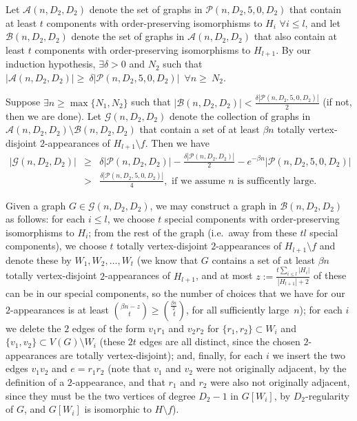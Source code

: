 \documentclass{article}
\newtheorem{Proof of Theorem}{Proof of Theorem}
\begin{document}
Let $\mathcal{A}(n,D_{2},D_{2})$ denote the set of graphs in $\mathcal{P}(n,D_{2},5,0,D_{2})$
that contain at least $t$ components with order-preserving isomorphisms to $H_{i}$ $\forall i \leq l$,
and let $\mathcal{B}(n,D_{2},D_{2})$ denote the set of graphs in $\mathcal{A}(n,D_{2},D_{2})$
that also contain at least $t$ components with order-preserving isomorphisms to $H_{l+1}$.
By our induction hypothesis,
$\exists \delta >0$ and $N_{2}$ such that
$|\mathcal{A}(n,D_{2},D_{2})| \!\geq~\!\!\delta |\mathcal{P}(n,D_{2},5,0,D_{2})|$~$\forall n \!\geq~\!\!N_{2}$.

Suppose $\exists n \geq \max \{ N_{1},N_{2} \}$ such that 
$|\mathcal{B}(n,D_{2},D_{2})| < \frac{\delta |\mathcal{P}(n,D_{2},5,0,D_{2})|}{2}$
(if not, then we are done).
Let $\mathcal{G}(n,D_{2},D_{2})$ denote the collection of graphs in 
$\mathcal{A}(n,D_{2},D_{2}) \setminus \mathcal{B}(n,D_{2},D_{2})$ that
contain a set of at least $\beta n$ totally vertex-disjoint $2$-appearances of $H_{l+1} \setminus f$.
Then we have 
\begin{eqnarray*}
|\mathcal{G}(n,D_{2},D_{2})| 
& \geq & \delta |\mathcal{P}(n,D_{2},D_{2})| \!-\! \frac{ \delta |\mathcal{P}(n,D_{2},D_{2})| }{2}
\!-\! e^{- \beta n} |\mathcal{P}(n,D_{2},5,0,D_{2})| \\
& > & \frac{\delta |\mathcal{P}(n,D_{2},5,0,D_{2})|}{4},
\textrm{ if we assume $n$ is sufficently large.}
\end{eqnarray*}

Given a graph $G \in \mathcal{G}(n,D_{2},D_{2})$,
we may construct a graph in $\mathcal{B}(n,D_{2},D_{2})$ as follows:
for each $i \leq l$,
we choose $t$ special components with order-preserving isomorphisms to $H_{i}$;
from the rest of the graph 
(i.e.~away from these $tl$ special components),
we choose $t$ totally vertex-disjoint $2$-appearances of $H_{l+1} \setminus f$
and denote these by $W_{1}, W_{2}, \ldots, W_{t}$
(we know that $G$ contains a set of at least $\beta n$ totally vertex-disjoint $2$-appearances of $H_{l+1}$,
and at most $z := \frac{ t \sum_{i \leq l}|H_{i}| }{ |H_{l+1}|+2 }$
of these can be in our special components,
so the number of choices that we have for our $2$-appearances is at least
$\left( ^{\beta n -z}_{\phantom{qw}t} \right) \geq \left( ^{\frac{\beta n}{2}}_{\phantom{q}t} \right)$,
for all sufficiently large~$n$);
for each $i$ we delete the $2$ edges of the form $v_{1}r_{1}$ and $v_{2}r_{2}$
for $\{ r_{1}, r_{2} \} \subset W_{i}$ and $ \{ v_{1}, v_{2} \} \subset V(G) \setminus W_{i}$
(these $2t$ edges are all distinct,
since the chosen $2$-appearances are totally vertex-disjoint);
and, finally,
for each $i$ we insert the two edges $v_{1}v_{2}$ and $e=r_{1}r_{2}$
(note that $v_{1}$ and $v_{2}$ were not originally adjacent,
by the definition of a $2$-appearance,
and that $r_{1}$ and $r_{2}$ were also not originally adjacent,
since they must be the two vertices of degree $D_{2}-1$ in $G[W_{i}]$,
by $D_{2}$-regularity of $G$,
and $G[W_{i}]$ is isomorphic to $H \setminus f$).
\end{document}

